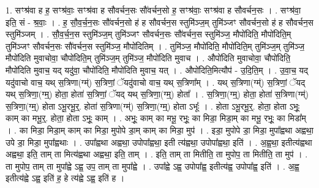 \documentclass[17pt]{extarticle}
\begin{document}
1. सꣳश्र॑वा ह ह॒ सꣳश्र॑वाः॒ सꣳश्र॑वा ह सौवर्चन॒सः सौ॑वर्चन॒सो ह॒ सꣳश्र॑वाः॒ सꣳश्र॑वा ह सौवर्चन॒सः । . सꣳश्र॑वा॒ इति॒ सं - श्र॒वाः॒ । . ह॒ सौ॒व॒र्च॒न॒सः सौ॑वर्चन॒सो ह॑ ह सौवर्चन॒स स्तुमि॑ञ्ज॒म् तुमि॑ञ्जꣳ सौवर्चन॒सो ह॑ ह सौवर्चन॒स स्तुमि॑ञ्जम् । . सौ॒व॒र्च॒न॒स स्तुमि॑ञ्ज॒म् तुमि॑ञ्जꣳ सौवर्चन॒सः सौ॑वर्चन॒स स्तुमि॑ञ्ज॒ मौपो॑दिति॒ मौपो॑दिति॒म् तुमि॑ञ्जꣳ सौवर्चन॒सः सौ॑वर्चन॒स स्तुमि॑ञ्ज॒ मौपो॑दितिम् । . तुमि॑ञ्ज॒ मौपो॑दिति॒ मौपो॑दिति॒म् तुमि॑ञ्ज॒म् तुमि॑ञ्ज॒ मौपो॑दिति मुवाचोवा॒ चौपो॑दिति॒म् तुमि॑ञ्ज॒म् तुमि॑ञ्ज॒ मौपो॑दिति मुवाच । . औपो॑दिति मुवाचोवा॒ चौपो॑दिति॒ मौपो॑दिति मुवाच॒ यद् यदु॑वा॒ चौपो॑दिति॒ मौपो॑दिति मुवाच॒ यत् । . औपो॑दिति॒मित्यौप॑ - उ॒दि॒ति॒म् । . उ॒वा॒च॒ यद् यदु॑वाचो वाच॒ यथ् स॒त्रिणा(ग्म्॑) स॒त्रिणां॒ ॅयदु॑वाचो वाच॒ यथ् स॒त्रिणा᳚म् । . यथ् स॒त्रिणा(ग्म्॑) स॒त्रिणां॒ ॅयद् यथ् स॒त्रिणा॒(ग्म्॒) होता॒ होता॑ स॒त्रिणां॒ ॅयद् यथ् स॒त्रिणा॒(ग्म्॒) होता᳚ । . स॒त्रिणा॒(ग्म्॒) होता॒ होता॑ स॒त्रिणा(ग्म्॑) स॒त्रिणा॒(ग्म्॒) होता ऽभू॒रभू॒र्॒. होता॑ स॒त्रिणा(ग्म्॑) स॒त्रिणा॒(ग्म्॒) होता ऽभूः᳚ । . होता ऽभू॒रभू॒र्॒. होता॒ होता ऽभूः॒ काम् का मभू॒र्॒. होता॒ होता ऽभूः॒ काम् । . अभूः॒ काम् का मभू॒ रभूः॒ का मिडा॒ मिडा॒म् का मभू॒ रभूः॒ का मिडा᳚म् । . का मिडा॒ मिडा॒म् काम् का मिडा॒ मुपोपे डा॒म् काम् का मिडा॒ मुप॑ । . इडा॒ मुपोपे डा॒ मिडा॒ मुपा᳚ह्वथा अह्वथा॒ उपे डा॒ मिडा॒ मुपा᳚ह्वथाः । . उपा᳚ह्वथा अह्वथा॒ उपोपा᳚ह्वथा॒ इती त्य॑ह्वथा॒ उपोपा᳚ह्वथा॒ इति॑ । . अ॒ह्व॒था॒ इतीत्य॑ह्वथा अह्वथा॒ इति॒ ताम् ता मित्य॑ह्वथा अह्वथा॒ इति॒ ताम् । . इति॒ ताम् ता मितीति॒ ता मुपोप॒ ता मितीति॒ ता मुप॑ । . ता मुपोप॒ ताम् ता मुपा᳚ह्वे ऽह्व॒ उप॒ ताम् ता मुपा᳚ह्वे । . उपा᳚ह्वे ऽह्व॒ उपोपा᳚ह्व॒ इतीत्य॑ह्व॒ उपोपा᳚ह्व॒ इति॑ । . अ॒ह्व॒ इतीत्य॑ह्वे ऽह्व॒ इति॑ ह॒ हे त्य॑ह्वे ऽह्व॒ इति॑ ह । \newline
\end{document}
